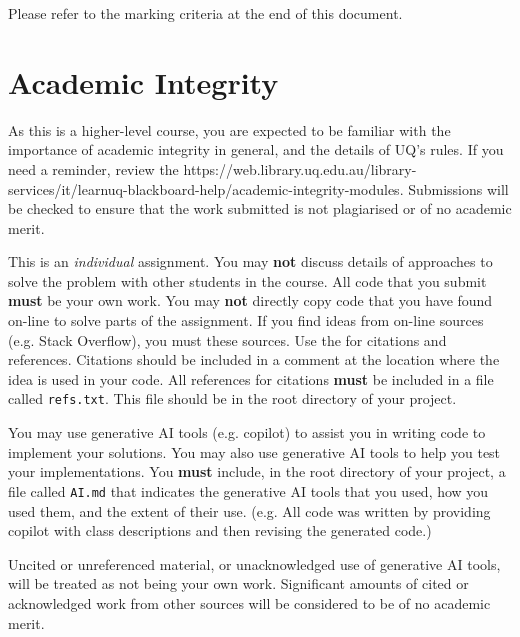 \documentclass{csse4400}
\begin{document}
Please refer to the marking criteria at the end of this document.

\section{Academic Integrity}
As this is a higher-level course, you are expected to be familiar with the importance of academic integrity in general, and the details of UQ's rules. If you need a reminder, review the  {https://web.library.uq.edu.au/library-services/it/learnuq-blackboard-help/academic-integrity-modules}. Submissions will be checked to ensure that the work submitted is not plagiarised or of no academic merit.

This is an \textit{individual} assignment. You may \textbf{not} discuss details of approaches to solve the problem with other students in the course. All code that you submit \textbf{must} be your own work. You may \textbf{not} directly copy code that you have found on-line to solve parts of the assignment. If you find ideas from on-line sources (e.g. Stack Overflow), you must  these sources. Use the  for citations and references. Citations should be included in a comment at the location where the idea is used in your code. All references for citations \textbf{must} be included in a file called \texttt{refs.txt}. This file should be in the root directory of your project.

You may use generative AI tools (e.g. copilot) to assist you in writing code to implement your solutions. You may also use generative AI tools to help you test your implementations. You \textbf{must} include, in the root directory of your project, a file called \texttt{AI.md} that indicates the generative AI tools that you used, how you used them, and the extent of their use. (e.g. All code was written by providing copilot with class descriptions and then revising the generated code.)

Uncited or unreferenced material, or unacknowledged use of generative AI tools, will be treated as not being your own work. Significant amounts of cited or acknowledged work from other sources will be considered to be of no academic merit.





\end{document}
